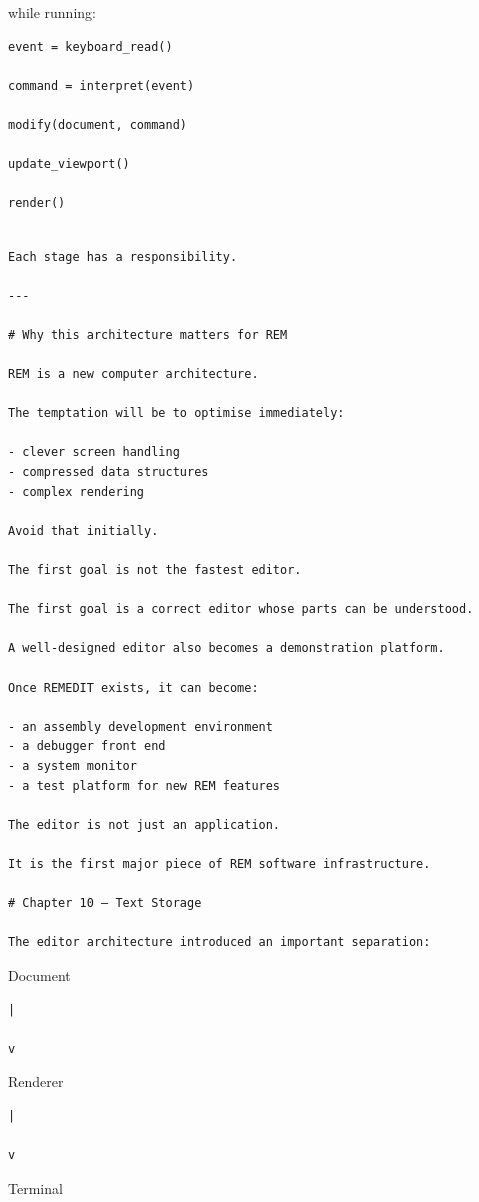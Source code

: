 \documentclass[
  oneside,
  openany]{book}
\begin{document}
while running:

\begin{verbatim}
event = keyboard_read()

command = interpret(event)

modify(document, command)

update_viewport()

render()
\end{verbatim}

\begin{verbatim}

Each stage has a responsibility.

---

# Why this architecture matters for REM

REM is a new computer architecture.

The temptation will be to optimise immediately:

- clever screen handling
- compressed data structures
- complex rendering

Avoid that initially.

The first goal is not the fastest editor.

The first goal is a correct editor whose parts can be understood.

A well-designed editor also becomes a demonstration platform.

Once REMEDIT exists, it can become:

- an assembly development environment
- a debugger front end
- a system monitor
- a test platform for new REM features

The editor is not just an application.

It is the first major piece of REM software infrastructure.

# Chapter 10 — Text Storage

The editor architecture introduced an important separation:
\end{verbatim}

Document

\begin{verbatim}
|

v
\end{verbatim}

Renderer

\begin{verbatim}
|

v
\end{verbatim}

Terminal
\end{document}

